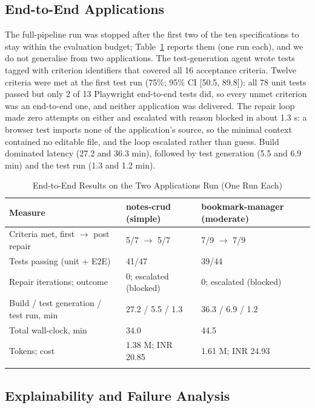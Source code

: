 \documentclass[pdflatex,sn-mathphys-num]{sn-jnl}%
\theoremstyle{thmstyleone}%
\theoremstyle{thmstyletwo}%
\theoremstyle{thmstylethree}%
\begin{document}
\subsection{End-to-End Applications}\label{sec8.5}

The full-pipeline run was stopped after the first two of the ten specifications to stay within the evaluation budget; Table~\ref{tab6} reports them (one run each), and we do not generalise from two applications. The test-generation agent wrote tests tagged with criterion identifiers that covered all 16 acceptance criteria. Twelve criteria were met at the first test run (75\%; 95\% CI [50.5, 89.8]): all 78 unit tests passed but only 2 of 13 Playwright end-to-end tests did, so every unmet criterion was an end-to-end one, and neither application was delivered. The repair loop made zero attempts on either and escalated with reason blocked in about 1.3 s: a browser test imports none of the application's source, so the minimal context contained no editable file, and the loop escalated rather than guess. Build dominated latency (27.2 and 36.3 min), followed by test generation (5.5 and 6.9 min) and the test run (1.3 and 1.2 min).

\begin{table}[t]
\caption{End-to-End Results on the Two Applications Run (One Run Each)}\label{tab6}%
\small
\begin{tabular*}{\textwidth}{@{\extracolsep\fill}p{4.2cm}p{3.4cm}p{3.4cm}@{}}
\toprule
\raggedright{}\textbf{Measure} & \centering{}\textbf{notes-crud (simple)} & \centering{}\textbf{bookmark-manager (moderate)}\tabularnewline
\midrule
\raggedright{}Criteria met, first $\rightarrow$ post repair & \centering{}5/7 $\rightarrow$ 5/7 & \centering{}7/9 $\rightarrow$ 7/9\tabularnewline
\raggedright{}Tests passing (unit + E2E) & \centering{}41/47 & \centering{}39/44\tabularnewline
\raggedright{}Repair iterations; outcome & \centering{}0; escalated (blocked) & \centering{}0; escalated (blocked)\tabularnewline
\raggedright{}Build / test generation / test run, min & \centering{}27.2 / 5.5 / 1.3 & \centering{}36.3 / 6.9 / 1.2\tabularnewline
\raggedright{}Total wall-clock, min & \centering{}34.0 & \centering{}44.5\tabularnewline
\raggedright{}Tokens; cost & \centering{}1.38 M; INR 20.85 & \centering{}1.61 M; INR 24.93\tabularnewline
\botrule
\end{tabular*}
\end{table}

\subsection{Explainability and Failure Analysis}\label{sec8.6}
\end{document}
